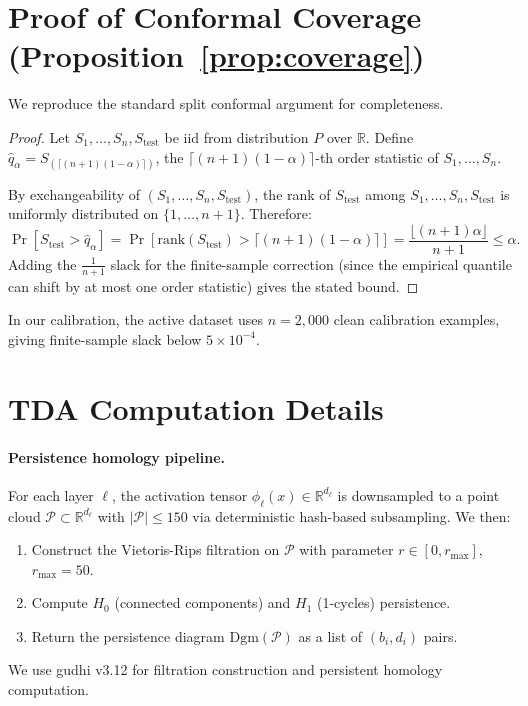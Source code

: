 \appendix

\section{Proof of Conformal Coverage (Proposition~\ref{prop:coverage})}
\label{app:coverage}

We reproduce the standard split conformal argument for completeness.

\begin{proof}
Let $S_1, \ldots, S_n, S_{\text{test}}$ be iid from distribution $P$ over $\mathbb{R}$.
Define $\hat{q}_\alpha = S_{(\lceil (n+1)(1-\alpha) \rceil)}$, 
the $\lceil (n+1)(1-\alpha) \rceil$-th order statistic of $S_1, \ldots, S_n$.

By exchangeability of $(S_1, \ldots, S_n, S_{\text{test}})$, 
the rank of $S_{\text{test}}$ among $S_1, \ldots, S_n, S_{\text{test}}$ 
is uniformly distributed on $\{1, \ldots, n+1\}$.
Therefore:
\[
  \Pr[S_{\text{test}} > \hat{q}_\alpha] 
  = \Pr\!\left[\mathrm{rank}(S_{\text{test}}) > \lceil(n+1)(1-\alpha)\rceil\right]
  = \frac{\lfloor (n+1)\alpha \rfloor}{n+1}
  \leq \alpha.
\]
Adding the $\frac{1}{n+1}$ slack for the finite-sample correction 
(since the empirical quantile can shift by at most one order statistic) 
gives the stated bound.
\end{proof}

\noindent
In our calibration, the active dataset uses $n=2{,}000$ clean calibration
examples, giving finite-sample slack below $5\times10^{-4}$.


\section{TDA Computation Details}
\label{app:tda}

\paragraph{Persistence homology pipeline.}
For each layer $\ell$, the activation tensor $\phi_\ell(x) \in \mathbb{R}^{d_\ell}$ 
is downsampled to a point cloud 
$\mathcal{P} \subset \mathbb{R}^{d_\ell}$ with $|\mathcal{P}| \leq 150$
via deterministic hash-based subsampling.
We then:
\begin{enumerate}[noitemsep]
  \item Construct the Vietoris-Rips filtration on $\mathcal{P}$ 
        with parameter $r \in [0, r_\text{max}]$, $r_\text{max}=50$.
  \item Compute $H_0$ (connected components) and $H_1$ (1-cycles) persistence.
  \item Return the persistence diagram $\mathrm{Dgm}(\mathcal{P})$ 
        as a list of $(b_i, d_i)$ pairs.
\end{enumerate}
We use gudhi v3.12 \cite{gudhi2015} for filtration construction and 
persistent homology computation.

